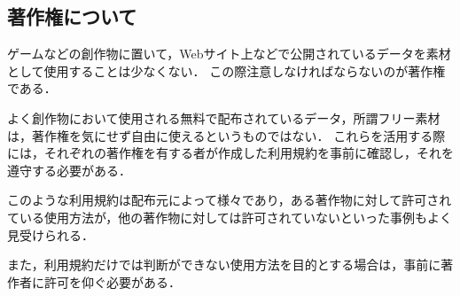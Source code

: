 
\subsection{著作権について}

ゲームなどの創作物に置いて，Webサイト上などで公開されているデータを素材として使用することは少なくない．
この際注意しなければならないのが著作権である．

よく創作物において使用される無料で配布されているデータ，所謂フリー素材は，著作権を気にせず自由に使えるというものではない．
これらを活用する際には，それぞれの著作権を有する者が作成した利用規約を事前に確認し，それを遵守する必要がある．

このような利用規約は配布元によって様々であり，ある著作物に対して許可されている使用方法が，他の著作物に対しては許可されていないといった事例もよく見受けられる．

また，利用規約だけでは判断ができない使用方法を目的とする場合は，事前に著作者に許可を仰ぐ必要がある．
